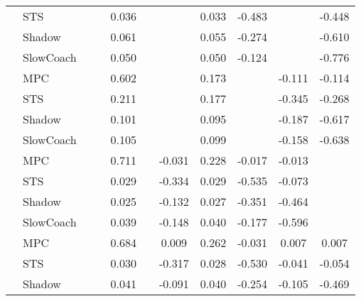 \begin{tabular}{|l|l|*{9}{c|}}
                                                           & STS &       &        &     0.036 &     &     &  0.033 &  -0.483 &      &   -0.448 \\
                                                           & Shadow &       &        &     0.061 &     &     &  0.055 &  -0.274 &      &   -0.610 \\
                                                           & SlowCoach &       &        &     0.050 &     &     &  0.050 &  -0.124 &      &   -0.776 \\
\midrule
[False, False, True, False, False, True, False, True, True] & MPC &       &        &     0.602 &     &     &  0.173 &      &  -0.111 &   -0.114 \\
                                                           & STS &       &        &     0.211 &     &     &  0.177 &      &  -0.345 &   -0.268 \\
                                                           & Shadow &       &        &     0.101 &     &     &  0.095 &      &  -0.187 &   -0.617 \\
                                                           & SlowCoach &       &        &     0.105 &     &     &  0.099 &      &  -0.158 &   -0.638 \\
\midrule
[False, False, True, False, True, True, True, True, False] & MPC &       &        &     0.711 &     & -0.031 &  0.228 &  -0.017 &  -0.013 &       \\
                                                           & STS &       &        &     0.029 &     & -0.334 &  0.029 &  -0.535 &  -0.073 &       \\
                                                           & Shadow &       &        &     0.025 &     & -0.132 &  0.027 &  -0.351 &  -0.464 &       \\
                                                           & SlowCoach &       &        &     0.039 &     & -0.148 &  0.040 &  -0.177 &  -0.596 &       \\
\midrule
[False, False, True, False, True, True, True, True, True] & MPC &       &        &     0.684 &     &  0.009 &  0.262 &  -0.031 &   0.007 &    0.007 \\
                                                           & STS &       &        &     0.030 &     & -0.317 &  0.028 &  -0.530 &  -0.041 &   -0.054 \\
                                                           & Shadow &       &        &     0.041 &     & -0.091 &  0.040 &  -0.254 &  -0.105 &   -0.469 \\

\end{tabular}
